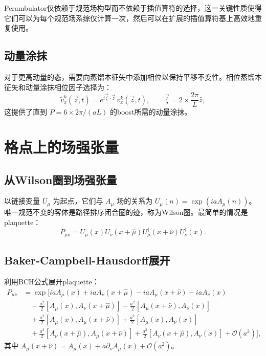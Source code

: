 \documentclass[11pt,a4paper]{article}
\begin{document}
Perambulator仅依赖于规范场构型而不依赖于插值算符的选择，这一关键性质使得它们可以为每个规范场系综仅计算一次，然后可以在扩展的插值算符基上高效地重复使用。

\subsection{动量涂抹}

对于更高动量的态，需要向蒸馏本征矢中添加相位以保持平移不变性\cite{Egerer:2020xma}。相位蒸馏本征矢和动量涂抹相位因子选择为：
\begin{equation}\label{eq:momentum_smearing}
    \tilde{v}^k_x(\vec{z},t) = e^{i\vec{\zeta}\cdot\vec{z}} \, v^k_x(\vec{z},t), \qquad \vec{\zeta} = 2 \times \frac{2\pi}{L} \hat{z},
\end{equation}
这提供了直到 $P = 6 \times 2\pi/(aL)$ 的boost所需的动量涂抹。

\section{格点上的场强张量}

\subsection{从Wilson圈到场强张量}

以链接变量 $U_\mu$ 为起点，它们与 $A_\mu$ 场的关系为 $U_\mu(n) = \exp(i a A_\mu(n))$。唯一规范不变的客体是路径排序闭合圈的迹，称为Wilson圈。最简单的情况是plaquette：
\begin{equation}\label{eq:plaquette}
    P_{\mu\nu} = U_\mu(x) U_\nu(x+\hat{\mu}) U^\dagger_\mu(x+\hat{\nu}) U^\dagger_\nu(x).
\end{equation}

\subsection{Baker-Campbell-Hausdorff展开}

利用BCH公式展开plaquette：
\begin{align}
    P_{\mu\nu} &= \exp\bigg[ i a A_\mu(x) + i a A_\nu(x+\hat{\mu}) - i a A_\mu(x+\hat{\nu}) - i a A_\nu(x) \nonumber\\
    &\quad -\frac{a^2}{2}[A_\mu(x), A_\nu(x+\hat{\mu})] - \frac{a^2}{2}[A_\mu(x+\hat{\nu}), A_\nu(x)] \nonumber\\
    &\quad +\frac{a^2}{2}[A_\mu(x), A_\mu(x+\hat{\nu})] + \frac{a^2}{2}[A_\mu(x), A_\nu(x)] \nonumber\\
    &\quad +\frac{a^2}{2}[A_\nu(x+\hat{\mu}), A_\mu(x+\hat{\nu})] + \frac{a^2}{2}[A_\nu(x+\hat{\mu}), A_\nu(x)] + \mathcal{O}(a^3) \bigg],
\end{align}
其中 $A_\mu(x+\hat{\nu}) = A_\mu(x) + a \partial_\nu A_\mu(x) + \mathcal{O}(a^2)$。
\end{document}
